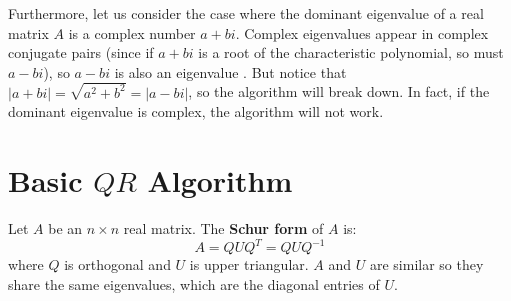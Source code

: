 \documentclass{article}
\begin{document}
Furthermore, let us consider the case where the dominant eigenvalue of a real matrix $A$ is a complex number $a+bi$. Complex eigenvalues appear in complex conjugate pairs (since if $a+bi$ is a root of the characteristic polynomial, so must $a-bi$), so $a-bi$ is also an eigenvalue \cite{utnlecture}. But notice that $\left|a+bi\right|=\sqrt{a^2+b^2}=\left|a-bi\right|$, so the algorithm will break down. In fact, if the dominant eigenvalue is complex, the algorithm will not work.


\section{Basic $QR$ Algorithm}
\begin{tcolorbox}[title={Schur form},colback=blue!5!white,colframe=blue!75!black,parbox=false]
	Let $A$ be an $n\times n$ real matrix. The \textbf{Schur form} of $A$ is:
	\begin{equation*}
		A=QUQ^T=QUQ^{-1}
	\end{equation*}
	where $Q$ is orthogonal and $U$ is upper triangular. $A$ and $U$ are similar so they share the same eigenvalues, which are the diagonal entries of $U$.
\end{tcolorbox}
\end{document}
